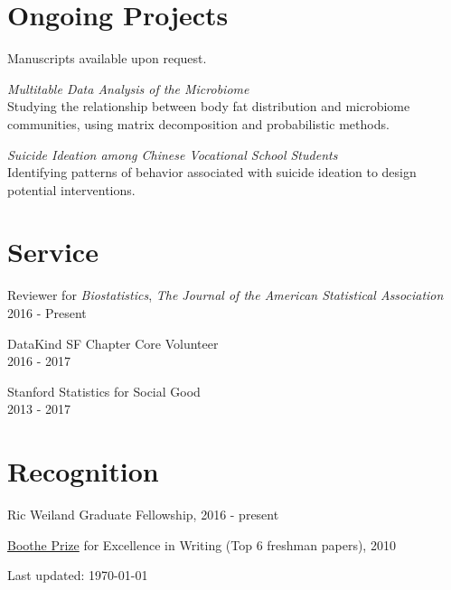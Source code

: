\documentclass[letterpaper]{article}
\def\footerlink{}
\renewenvironment{itemize}{
  \begin{list}{}{
    \setlength{\leftmargin}{1.5em}
  }
}{
  \end{list}
}
\begin{document}
\section*{Ongoing Projects}
Manuscripts available upon request.
\begin{itemize}
  \item \textit{Multitable Data Analysis of the Microbiome} \\
    Studying the relationship between body fat distribution and microbiome
    communities, using matrix decomposition and probabilistic methods.
  \item \textit{Suicide Ideation among Chinese Vocational School Students} \\
    Identifying patterns of behavior associated with suicide ideation to design
    potential interventions.
\end{itemize}

\section*{Service}

\begin{itemize}
\item Reviewer for \textit{Biostatistics}, \textit{The Journal of the American Statistical Association} \\
  2016 - Present
\item DataKind SF Chapter Core Volunteer \\
  2016 - 2017
\item Stanford Statistics for Social Good \\
  2013 - 2017
\end{itemize}

\section*{Recognition}
\begin{itemize}
\item Ric Weiland Graduate Fellowship, 2016 - present
\item \href{https://undergrad.stanford.edu/programs/pwr/publications-prizes-and-awards/boothe-prize-essays}{Boothe Prize} for Excellence in Writing (Top 6 freshman papers), 2010
\end{itemize}

\begin{center}
  \begin{footnotesize}
    Last updated: \today \\
    \href{\footerlink}{\texttt{\footerlink}}
  \end{footnotesize}
\end{center}
\end{document}
